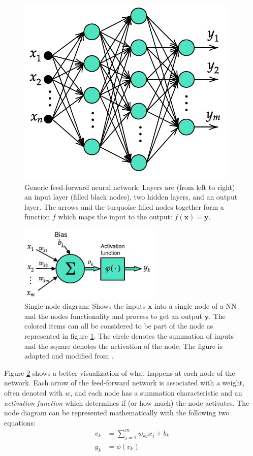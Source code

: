 \begin{figure}[ht]
    \centering
    \includegraphics{img/generic-ann-diagram}
    \caption{Generic feed-forward neural network: Layers are (from left to right): an input layer (filled black nodes), two hidden layers, and an output layer. The arrows and the turquoise filled nodes together form a function $f$ which maps the input to the output: $f(\mathbf{x})=\mathbf{y} $.}
    \label{fig:generic-ann}
\end{figure}

\begin{figure}[ht!]
    \centering
    \includegraphics[width=0.6\textwidth]{img/node-diagram}
    \caption{Single node diagram: Shows the inputs $\mathbf{x}$ into a single node of a \ac{NN} and the nodes functionality and process to get an output $\mathbf{y}$. The colored items can all be considered to be part of the node as represented in figure \ref{fig:generic-ann}. The circle denotes the summation of inputs and the square denotes the activation of the node. The figure is adapted and modified from \cite[Fig. 5]{Haykin2009}.}
    \label{fig:node-diagram}
\end{figure}

Figure \ref{fig:node-diagram} shows a better visualization of what happens at each node of the network.
Each arrow of the feed-forward network is associated with a weight, often denoted with $w$, and each node has a summation characteristic and an \textit{activation function} which determines if (or how much) the node activates.
The node diagram can be represented mathematically with the following two equations:
\begin{align}
    v_k &= \sum_{j=1}^m w_{kj}x_j + b_k \\
    y_k &= \phi (v_k)
\end{align}

